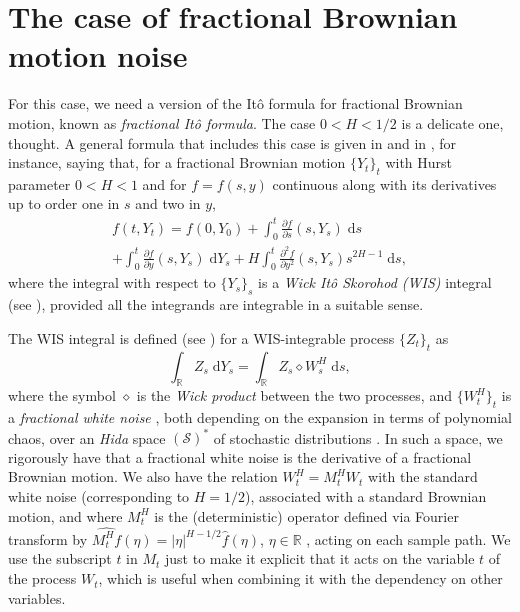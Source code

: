 \documentclass[reqno,12pt]{amsart}
\theoremstyle{plain}%
\theoremstyle{definition}
\begin{document}
\section{The case of fractional Brownian motion noise}

For this case, we need a version of the It\^o formula for fractional Brownian motion, known as \emph{fractional It\^o formula}. The case $0 < H < 1/2$ is a delicate one, thought. A general formula that includes this case is given in \cite[Theorem 4.2.6]{BHOB2008} and in \cite[Theorem 4.1]{Bender2003}, for instance, saying that, for a fractional Brownian motion $\{Y_t\}_t$ with Hurst parameter $0 < H < 1$ and for $f=f(s, y)$ continuous along with its derivatives up to order one in $s$ and two in $y$,
\begin{multline}
    \label{fractionalItoformula}
    f(t, Y_t) = f(0, Y_0) + \int_0^t \frac{\partial f}{\partial s}(s, Y_s)\;\mathrm{d}s \\
        + \int_0^t \frac{\partial f}{\partial y}(s, Y_s)\;\mathrm{d}Y_s + H \int_0^t \frac{\partial^2 f}{\partial y^2}(s, Y_s)s^{2H - 1}\;\mathrm{d}s,
\end{multline}
where the integral with respect to $\{Y_s\}_s$ is a \emph{Wick It\^o Skorohod (WIS)} integral (see \cite[Chapter 4]{BHOB2008}), provided all the integrands are integrable in a suitable sense.

The WIS integral is defined (see \cite[Definition 4.2.2]{BHOB2008}) for a WIS-integrable process $\{Z_t\}_t$ as
\begin{equation}
    \label{defWISintegralinR}
    \int_\mathbb{R} Z_s\;\mathrm{d}Y_s = \int_\mathbb{R} Z_s \diamond W_s^H \;\mathrm{d}s,
\end{equation}
where the symbol $\diamond$ is the \emph{Wick product} \cite[Definition A.1.7]{BHOB2008} between the two processes, and $\{W_t^H\}_{t}$ is a \emph{fractional white noise} \cite[eq. (4.16)]{BHOB2008}, both depending on the expansion in terms of polynomial chaos, over an \emph{Hida} space $(\mathcal{S})^*$ of stochastic distributions \cite[Definition A.1.4]{BHOB2008}. In such a space, we rigorously have that a fractional white noise is the derivative of a fractional Brownian motion. We also have the relation $W_t^H = M_t^HW_t$ with the standard white noise (corresponding to $H=1/2$), associated with a standard Brownian motion, and where $M_t^H$ is the (deterministic) operator defined via Fourier transform by $\widehat{M_t^Hf}(\eta) = |\eta|^{H-1/2}\hat{f}(\eta)$, $\eta\in \mathbb{R}$ \cite[Definition 4.1.2]{BHOB2008}, acting on each sample path. We use the subscript $t$ in $M_t$ just to make it explicit that it acts on the variable $t$ of the process $W_t$, which is useful when combining it with the dependency on other variables.
\end{document}
